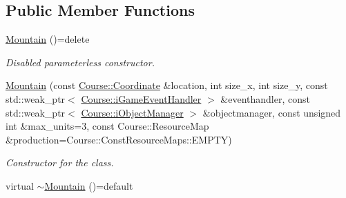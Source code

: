 \subsection*{Public Member Functions}
\begin{DoxyCompactItemize}
\item 
\hypertarget{class_student_1_1_mountain_a78aa78598c9cfb95a58fb74150d624e3}{\hyperlink{class_student_1_1_mountain_a78aa78598c9cfb95a58fb74150d624e3}{Mountain} ()=delete}\label{class_student_1_1_mountain_a78aa78598c9cfb95a58fb74150d624e3}

\begin{DoxyCompactList}\small\item\em Disabled parameterless constructor. \end{DoxyCompactList}\item 
\hyperlink{class_student_1_1_mountain_aed43e74688dfb62eae5bec20dc404c5d}{Mountain} (const \hyperlink{class_course_1_1_coordinate}{Course\-::\-Coordinate} \&location, int size\-\_\-x, int size\-\_\-y, const std\-::weak\-\_\-ptr$<$ \hyperlink{class_course_1_1i_game_event_handler}{Course\-::i\-Game\-Event\-Handler} $>$ \&eventhandler, const std\-::weak\-\_\-ptr$<$ \hyperlink{class_course_1_1i_object_manager}{Course\-::i\-Object\-Manager} $>$ \&objectmanager, const unsigned int \&max\-\_\-units=3, const Course\-::\-Resource\-Map \&production=Course\-::\-Const\-Resource\-Maps\-::\-E\-M\-P\-T\-Y)
\begin{DoxyCompactList}\small\item\em Constructor for the class. \end{DoxyCompactList}\item 
\hypertarget{class_student_1_1_mountain_af7f9af7973ea3516081733a8c0ffc2fd}{virtual \hyperlink{class_student_1_1_mountain_af7f9af7973ea3516081733a8c0ffc2fd}{$\sim$\-Mountain} ()=default}\label{class_student_1_1_mountain_af7f9af7973ea3516081733a8c0ffc2fd}


\end{DoxyCompactItemize}
